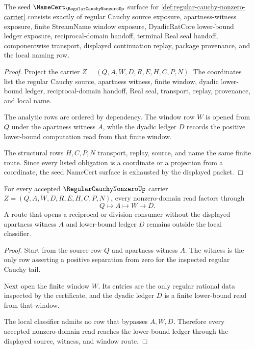 \begin{theorem}
\label{thm:regular-cauchy-nonzero-namecert-obligations}
The seed $\NameCert_{\RegularCauchyNonzeroUp}$ surface for \autoref{def:regular-cauchy-nonzero-carrier} consists exactly of regular Cauchy source exposure, apartness-witness exposure, finite StreamName window exposure, DyadicRatCore lower-bound ledger exposure, reciprocal-domain handoff, terminal Real seal handoff, componentwise transport, displayed continuation replay, package provenance, and the local naming row.
\end{theorem}
\begin{proof}
Project the carrier $Z=(Q,A,W,D,R,E,H,C,P,N)$. The coordinates list the regular Cauchy source, apartness witness, finite window, dyadic lower-bound ledger, reciprocal-domain handoff, Real seal, transport, replay, provenance, and local name.

The analytic rows are ordered by dependency. The window row $W$ is opened from $Q$ under the apartness witness $A$, while the dyadic ledger $D$ records the positive lower-bound computation read from that finite window.

The structural rows $H,C,P,N$ transport, replay, source, and name the same finite route. Since every listed obligation is a coordinate or a projection from a coordinate, the seed NameCert surface is exhausted by the displayed packet.
\end{proof}

\begin{theorem}
\label{thm:regular-cauchy-nonzero-apartness-window}
For every accepted $\RegularCauchyNonzeroUp$ carrier $Z=(Q,A,W,D,R,E,H,C,P,N)$, every nonzero-domain read factors through
$$
Q\longmapsto A\longmapsto W\longmapsto D.
$$
A route that opens a reciprocal or division consumer without the displayed apartness witness $A$ and lower-bound ledger $D$ remains outside the local classifier.
\end{theorem}
\begin{proof}
Start from the source row $Q$ and apartness witness $A$. The witness is the only row asserting a positive separation from zero for the inspected regular Cauchy tail.

Next open the finite window $W$. Its entries are the only regular rational data inspected by the certificate, and the dyadic ledger $D$ is a finite lower-bound read from that window.

The local classifier admits no row that bypasses $A,W,D$. Therefore every accepted nonzero-domain read reaches the lower-bound ledger through the displayed source, witness, and window route.
\end{proof}

